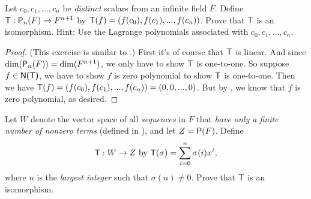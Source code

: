\begin{exercise} \label{exercise 2.4.22}
Let \(c_0, c_1, ..., c_n\) be \emph{distinct} scalars from an infinite field \(F\).
Define \(\textsf{T}: \textsf{P}_n(F) \to F^{n + 1}\) by \(\textsf{T}(f) = (f(c_0), f(c_1), ..., f(c_n))\).
Prove that \(\textsf{T}\) is an isomorphism.
Hint: Use the Lagrange polynomials associated with \(c_0, c_1, ..., c_n\).
\end{exercise}

\begin{proof}
(This exercise is similar to .)
First it's of course that \(\textsf{T}\) is linear.
And since \(\dim(\textsf{P}_n(F)) = \dim(F^{n + 1})\), we only have to show \(\textsf{T}\) is one-to-one.
So suppose \(f \in \textsf{N(T)}\), we have to show \(f\) is zero polynomial to show \(\textsf{T}\) is one-to-one.
Then we have \(\textsf{T}(f) = (f(c_0), f(c_1), ..., f(c_n)) = (0, 0, ..., 0)\).
But by , we know that \(f\) is zero polynomial, as desired.
\end{proof}

\begin{exercise} \label{exercise 2.4.23}
Let \(W\) denote the vector space of all \emph{sequences} in \(F\) that \emph{have only a finite number of nonzero terms} (defined in ),
and let \(Z = \textsf{P}(F)\).
Define
\[
    \textsf{T} : W \to Z \text{ by } \textsf{T}(\sigma) = \sum_{i = 0}^n \sigma(i)x^i,
\]
where \(n\) is the \emph{largest integer} such that \(\sigma(n) \ne 0\). Prove that \(\textsf{T}\) is an isomorphism.
\end{exercise}


